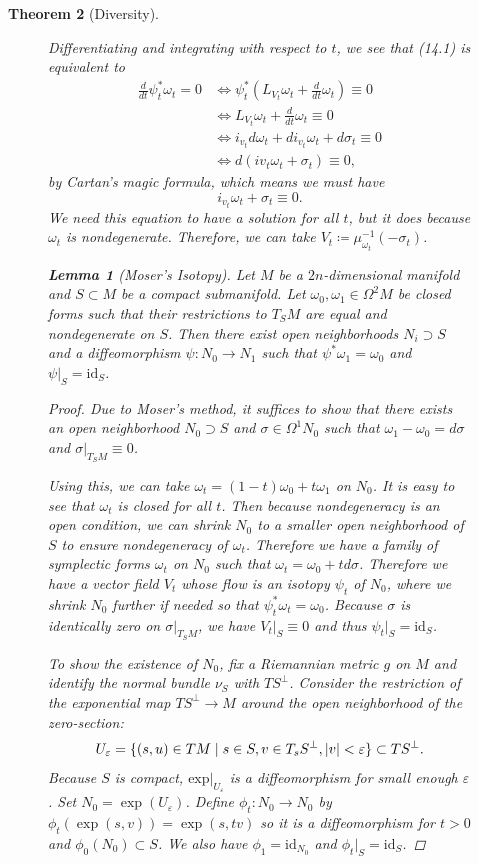 \documentclass[leqno, openany]{memoir}
\newtheorem{thm}{Theorem}[chapter]
\newtheorem{lem}[thm]{Lemma}
\theoremstyle{definition}
\theoremstyle{remark}
\theoremstyle{plain}
\theoremstyle{definition}
\theoremstyle{remark}
\newcommand{\ep}{\varepsilon}
\newcommand{\mr}[1]{\mathrm{#1}}
\begin{document}
\begin{thm}[Diversity]
\begin{figure}[H]
Differentiating and integrating with respect to $t$, we see that (14.1) is
equivalent to \begin{align*} \frac{d}{dt} \psi_t^*\omega_t = 0 &\Leftrightarrow
    \psi_t^*\left(L_{V_t} \omega_t + \frac{d}{dt} \omega_t \right) \equiv 0 \\
    &\Leftrightarrow L_{V_t} \omega_t + \frac{d}{dt} \omega_t \equiv 0 \\
    &\Leftrightarrow i_{v_t} d \omega_t + d i_{v_t} \omega_t + d \sigma_t
\equiv 0 \\ &\Leftrightarrow d (i v_t \omega_t + \sigma_t) \equiv 0,
\end{align*} by Cartan's magic formula, which means we must have \[ i_{v_t}
\omega_t + \sigma_t \equiv 0. \] We need this equation to have a solution for
all $t$, but it does because $\omega_t$ is nondegenerate. Therefore, we can
take $V_t \coloneqq \mu_{\omega_t}^{-1}(- \sigma_t)$.

\begin{lem}[Moser's Isotopy] Let $M$ be a $2n$-dimensional manifold and $S
    \subset M$ be a compact submanifold. Let $\omega_0, \omega_1 \in \Omega^2
    M$ be closed forms such that their restrictions to $T_S M$ are equal and
    nondegenerate on $S$. Then there exist open neighborhoods $N_i \supset S$
    and a diffeomorphism $\psi: N_0 \to N_1$ such that $\psi^* \omega_1 =
    \omega_0$ and $\psi |_S = \mr{id}_S$.  \end{lem} \begin{proof} Due to
    Moser's method, it suffices to show that there exists an open neighborhood
    $N_0 \supset S$ and $\sigma \in \Omega^1 N_0$ such that $\omega_1 -
    \omega_0 = d \sigma$ and $\sigma |_{T_SM} \equiv 0$.

    Using this, we can take $\omega_t = (1 - t) \omega_0 + t \omega_1$ on
    $N_0$. It is easy to see that $\omega_t$ is closed for all $t$. Then
    because nondegeneracy is an open condition, we can shrink $N_0$ to a
    smaller open neighborhood of $S$ to ensure nondegeneracy of $\omega_t$.
    Therefore we have a family of symplectic forms $\omega_t$ on $N_0$ such
    that $\omega_t = \omega_0 + t d \sigma$. Therefore we have a vector field
    $V_t$ whose flow is an isotopy $\psi_t$ of $N_0$, where we shrink $N_0$
    further if needed so that $\psi_t^* \omega_t = \omega_0$. Because $\sigma$
    is identically zero on $\sigma |_{T_SM}$, we have $V_t |_S \equiv 0$ and
    thus $\psi_t|_S = \mr{id}_S$.

    To show the existence of $N_0$, fix a Riemannian metric $g$ on $M$ and
    identify the normal bundle $\nu_S$ with $TS^{\perp}$. Consider the
    restriction of the exponential map $TS^{\perp} \to M$ around the open
    neighborhood of the zero-section: \[ U_{\ep} = \{ (s,u) \in TM \mid s \in
    S, v \in T_s S^{\perp}, \abs{v} < \ep \} \subset TS^{\perp}. \] Because $S$
    is compact, $\mr{exp} |_{U_{\ep}}$ is a diffeomorphism for small enough
    $\ep$. Set $N_0 = \exp(U_{\ep})$. Define $\phi_t:N_0 \to N_0$ by
    $\phi_t(\exp(s,v)) = \exp(s, tv)$ so it is a diffeomorphism for $t > 0$ and
    $\phi_0(N_0) \subset S$. We also have $\phi_1 = \mr{id}_{N_0}$ and $\phi_t
    |_S = \mr{id}_S$.


\end{proof}
\end{figure}
\end{thm}
\end{document}
